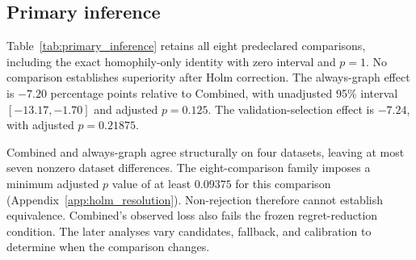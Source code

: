 \subsection{Primary inference}



Table~\ref{tab:primary_inference} retains all eight predeclared comparisons, including the exact homophily-only identity with zero interval and $p=1$. No comparison establishes superiority after Holm correction. The always-graph effect is $-7.20$ percentage points relative to Combined, with unadjusted 95\% interval $[-13.17,-1.70]$ and adjusted $p=0.125$. The validation-selection effect is $-7.24$, with adjusted $p=0.21875$.

Combined and always-graph agree structurally on four datasets, leaving at most seven nonzero dataset differences. The eight-comparison family imposes a minimum adjusted $p$ value of at least $0.09375$ for this comparison (Appendix~\ref{app:holm_resolution}). Non-rejection therefore cannot establish equivalence. Combined's observed loss also fails the frozen regret-reduction condition. The later analyses vary candidates, fallback, and calibration to determine when the comparison changes.
